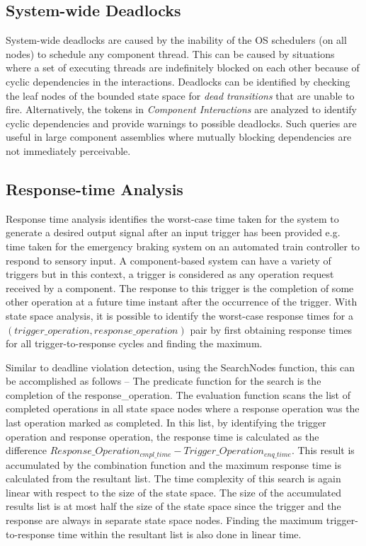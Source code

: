 \subsection{System-wide Deadlocks}

System-wide deadlocks are caused by the inability of the OS schedulers (on all nodes) to schedule any component thread. This can be caused by situations where a set of executing threads are indefinitely blocked on each other because of cyclic dependencies in the interactions. Deadlocks can be identified by checking the leaf nodes of the bounded state space for \emph{dead transitions} that are unable to fire. Alternatively, the tokens in \emph{Component Interactions} are analyzed to identify cyclic dependencies and provide warnings to possible deadlocks. Such queries are useful in large component assemblies where mutually blocking dependencies are not immediately perceivable. 

\subsection{Response-time Analysis}

Response time analysis identifies the worst-case time taken for the system to generate a desired output signal after an input trigger has been provided e.g. time taken for the emergency braking system on an automated train controller to respond to sensory input. A component-based system can have a variety of triggers but in this context, a trigger is considered as any operation request received by a component. The response to this trigger is the completion of some other operation at a future time instant after the occurrence of the trigger. With state space analysis, it is possible to identify the worst-case response times for a $(trigger\_operation, response\_operation)$ pair by first obtaining response times for all trigger-to-response cycles and finding the maximum. 

Similar to deadline violation detection, using the SearchNodes function, this can be accomplished as follows -- The predicate function for the search is the completion of the response\_operation. The evaluation function scans the list of completed operations in all state space nodes where a response operation was the last operation marked as completed. In this list, by identifying the trigger operation and response operation, the response time is calculated as the difference $Response\_Operation_{cmpl\_time} - Trigger\_Operation_{enq\_time}$. This result is accumulated by the combination function and the maximum response time is calculated from the resultant list. The time complexity of this search is again linear with respect to the size of the state space. The size of the accumulated results list is at most half the size of the state space since the trigger and the response are always in separate state space nodes. Finding the maximum trigger-to-response time within the resultant list is also done in linear time.   

